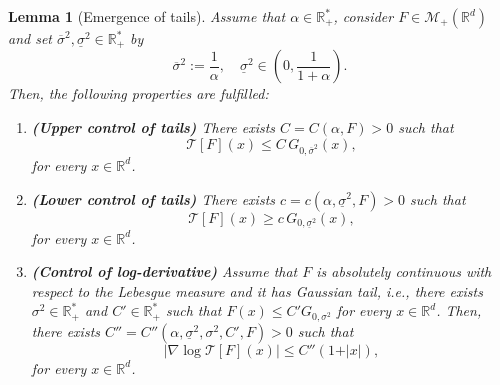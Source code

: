 \documentclass[reqno]{amsart}
\newtheorem{lemma}[definition]{Lemma}
\numberwithin{equation}{section}
\begin{document}
{\begin{lemma}[Emergence of tails]\label{L-sexual-reproduction-Gaussian-tails}
Assume that $\alpha\in \mathbb{R}_+^*$, consider $F\in \mathcal{M}_+(\mathbb{R}^d)$ and set $\overline{\sigma}^2,\underline{\sigma}^2\in \mathbb{R}_+^*$ by
$$\overline{\sigma}^2:=\frac{1}{\alpha},\quad \underline{\sigma}^2\in \left(0,\frac{1}{1+\alpha}\right).$$
Then, the following properties are fulfilled:
\begin{enumerate}
\item {\bf (Upper control of tails)} There exists $C=C(\alpha,F)>0$ such that
\begin{equation}\label{E-sexual-reproduction-operator-upper-bound-Gaussian}
\mathcal{T}[F](x)\leq C\,G_{0,\overline{\sigma}^2}(x),
\end{equation}
for every $x\in \mathbb{R}^d$.
\item {\bf (Lower control of tails)} There exists $c=c(\alpha,\underline{\sigma}^2,F)>0$ such that
\begin{equation}\label{E-sexual-reproduction-operator-lower-bound-Gaussian}
\mathcal{T}[F](x)\geq c\,G_{0,\underline{\sigma}^2}(x),
\end{equation}
for every $x\in \mathbb{R}^d$.
\item {\bf (Control of log-derivative)} Assume that $F$ is absolutely continuous with respect to the Lebesgue measure and it has Gaussian tail, {\em i.e.}, there exists $\sigma^2\in \mathbb{R}_+^*$ and $C'\in \mathbb{R}_+^*$ such that $F(x)\leq C' G_{0,\sigma^2}$ for every $x\in \mathbb{R}^d$. Then, there exists $C''=C''(\alpha,\underline{\sigma}^2,\sigma^2,C',F)>0$ such that
\begin{equation}\label{E-sexual-reproduction-operator-log-derivative}
\vert \nabla \log \mathcal{T}[F](x)\vert\leq C''(1+\vert x\vert),
\end{equation}
for every $x\in \mathbb{R}^d$.
\end{enumerate}
\end{lemma}

}
\end{document}
